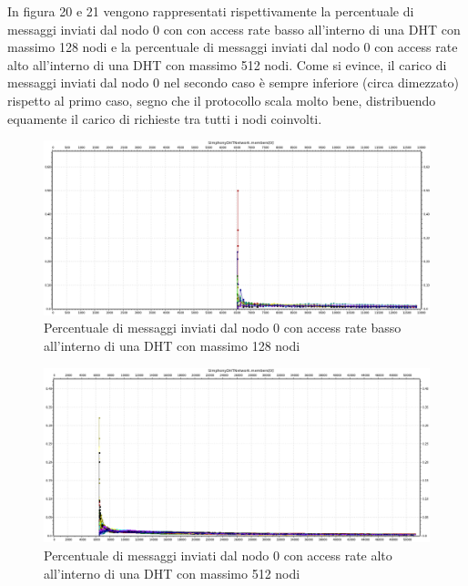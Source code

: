\documentclass[	
	DIV=calc,
	paper=a4,
	fontsize=11pt,
	onecolumn
]{scrartcl} %
\begin{document}
	In figura 20 e 21 vengono rappresentati rispettivamente la percentuale di messaggi inviati dal nodo 0 con con access rate basso all'interno di una DHT con massimo 128 nodi e la percentuale di messaggi inviati dal nodo 0 con access rate alto all'interno di una DHT con massimo 512 nodi. Come si evince, il carico di messaggi inviati dal nodo 0 nel secondo caso è sempre inferiore (circa dimezzato) rispetto al primo caso, segno che il protocollo scala molto bene, distribuendo equamente il carico di richieste tra tutti i nodi coinvolti.
	
	\begin{figure}[H]
		\centering
		\includegraphics[scale=0.35]	{SymphonyDHT/plots/PercentageOfMessagesSent/128_Nodes_SlowAccess/SymphonyDHT_128Nodes_SlowAccess_Node0.png}
		\caption{Percentuale di messaggi inviati dal nodo 0 con access rate basso all'interno di una DHT con massimo 128 nodi}
		\label{Figura 20}
	\end{figure}
	\begin{figure}[H]
		\centering
		\includegraphics[scale=0.35]	{SymphonyDHT/plots/PercentageOfMessagesSent/512_Nodes_FastAccess/SymphonyDHT_512Nodes_FastAccess_Node0.png}
		\caption{Percentuale di messaggi inviati dal nodo 0 con access rate alto all'interno di una DHT con massimo 512 nodi}
		\label{Figura 21}
	\end{figure}
	
\end{document}
